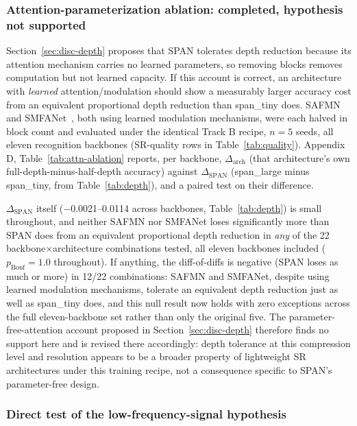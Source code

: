 \documentclass[pdflatex,sn-vancouver-num]{sn-jnl}
\begin{document}
\subsubsection{Attention-parameterization ablation: completed, hypothesis not supported}

Section~\ref{sec:disc-depth} proposes that SPAN tolerates depth reduction because its attention mechanism carries no learned parameters, so removing blocks removes computation but not learned capacity. If this account is correct, an architecture with \emph{learned} attention/modulation should show a measurably larger accuracy cost from an equivalent proportional depth reduction than span\_tiny does. SAFMN~\cite{sun2023safmn} and SMFANet~\cite{zheng2024smfanet}, both using learned modulation mechanisms, were each halved in block count and evaluated under the identical Track B recipe, $n=5$ seeds, all eleven recognition backbones (SR-quality rows in Table~\ref{tab:quality}). Appendix D, Table~\ref{tab:attn-ablation} reports, per backbone, $\Delta_{\text{arch}}$ (that architecture's own full-depth-minus-half-depth accuracy) against $\Delta_{\text{SPAN}}$ (span\_large minus span\_tiny, from Table~\ref{tab:depth}), and a paired test on their difference.

$\Delta_{\text{SPAN}}$ itself ($-$0.0021--0.0114 across backbones, Table~\ref{tab:depth}) is small throughout, and neither SAFMN nor SMFANet loses significantly more than SPAN does from an equivalent proportional depth reduction in \emph{any} of the 22 backbone$\times$architecture combinations tested, all eleven backbones included ($p_{\text{Bonf}}{=}1.0$ throughout). If anything, the diff-of-diffs is negative (SPAN loses as much or more) in 12/22 combinations: SAFMN and SMFANet, despite using learned modulation mechanisms, tolerate an equivalent depth reduction just as well as span\_tiny does, and this null result now holds with zero exceptions across the full eleven-backbone set rather than only the original five. The parameter-free-attention account proposed in Section~\ref{sec:disc-depth} therefore finds no support here and is revised there accordingly: depth tolerance at this compression level and resolution appears to be a broader property of lightweight SR architectures under this training recipe, not a consequence specific to SPAN's parameter-free design.

\subsubsection{Direct test of the low-frequency-signal hypothesis}
\label{sec:freq-ablation}
\end{document}
